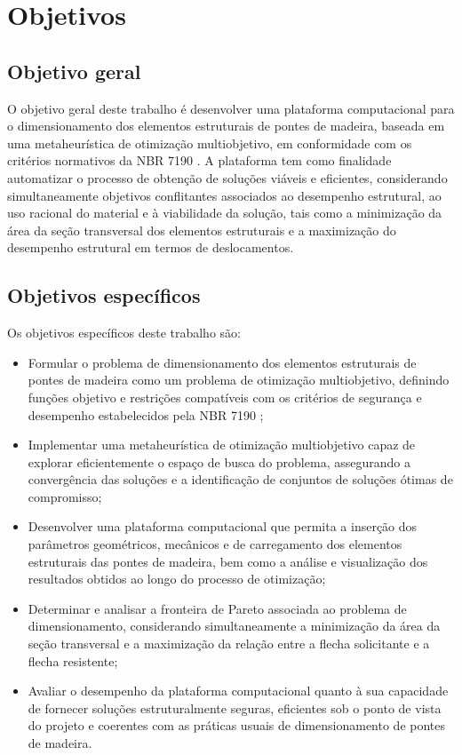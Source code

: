 \section{Objetivos}

\subsection{Objetivo geral}

O objetivo geral deste trabalho é desenvolver uma plataforma computacional para o dimensionamento dos elementos estruturais de pontes de madeira, baseada em uma metaheurística de otimização multiobjetivo, em conformidade com os critérios normativos da NBR 7190 \parencite{NBR7190-1:2022}. A plataforma tem como finalidade automatizar o processo de obtenção de soluções viáveis e eficientes, considerando simultaneamente objetivos conflitantes associados ao desempenho estrutural, ao uso racional do material e à viabilidade da solução, tais como a minimização da área da seção transversal dos elementos estruturais e a maximização do desempenho estrutural em termos de deslocamentos.

\subsection{Objetivos específicos}

Os objetivos específicos deste trabalho são:

\begin{itemize}
    \item Formular o problema de dimensionamento dos elementos estruturais de pontes de madeira como um problema de otimização multiobjetivo, definindo funções objetivo e restrições compatíveis com os critérios de segurança e desempenho estabelecidos pela NBR 7190 \parencite{NBR7190-1:2022};

    \item Implementar uma metaheurística de otimização multiobjetivo capaz de explorar eficientemente o espaço de busca do problema, assegurando a convergência das soluções e a identificação de conjuntos de soluções ótimas de compromisso;

    \item Desenvolver uma plataforma computacional que permita a inserção dos parâmetros geométricos, mecânicos e de carregamento dos elementos estruturais das pontes de madeira, bem como a análise e visualização dos resultados obtidos ao longo do processo de otimização;

    \item Determinar e analisar a fronteira de Pareto associada ao problema de dimensionamento, considerando simultaneamente a minimização da área da seção transversal e a maximização da relação entre a flecha solicitante e a flecha resistente;

    \item Avaliar o desempenho da plataforma computacional quanto à sua capacidade de fornecer soluções estruturalmente seguras, eficientes sob o ponto de vista do projeto e coerentes com as práticas usuais de dimensionamento de pontes de madeira.
\end{itemize}


